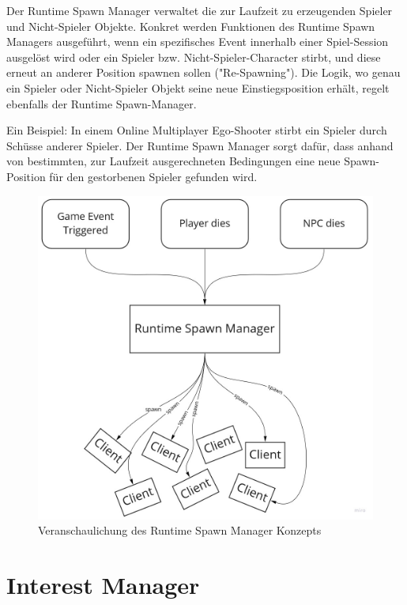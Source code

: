 Der Runtime Spawn Manager verwaltet die zur Laufzeit zu erzeugenden Spieler und Nicht-Spieler Objekte. Konkret werden Funktionen des Runtime Spawn Managers ausgeführt, wenn ein spezifisches Event innerhalb einer Spiel-Session ausgelöst wird oder ein Spieler bzw. Nicht-Spieler-Character stirbt, und diese erneut an anderer Position spawnen sollen ("Re-Spawning"). Die Logik, wo genau ein Spieler oder Nicht-Spieler Objekt seine neue Einstiegsposition erhält, regelt ebenfalls der Runtime Spawn-Manager.

Ein Beispiel: In einem Online Multiplayer Ego-Shooter \cite{Wikipedia.2021g} stirbt ein Spieler durch Schüsse anderer Spieler. Der Runtime Spawn Manager sorgt dafür, dass anhand von bestimmten, zur Laufzeit ausgerechneten Bedingungen eine neue Spawn-Position für den gestorbenen Spieler gefunden wird. 

\begin{figure}
	\centering
	\includegraphics[width=150mm]{images/Runtime_Spawn_Manager.jpg}
	\caption[Runtime Spawn Manager]{Veranschaulichung des Runtime Spawn Manager Konzepts}
	\label{pic:Runtime_Spawn_Manager}
\end{figure}

\section{Interest Manager}

